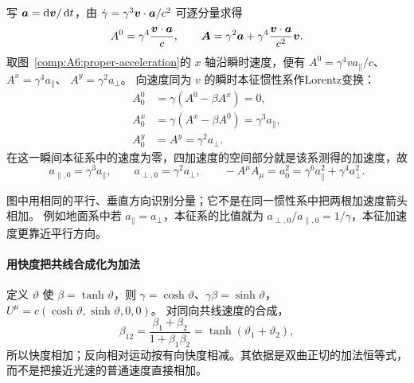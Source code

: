 写 $\bm{a}=\mathop{}\!\mathrm d\bm{v}/\mathop{}\!\mathrm d t$，由
$\dot\gamma=\gamma^3\bm{v}\cdot\bm{a}/c^2$ 可逐分量求得
\[
 A^0=\gamma^4\frac{\bm{v}\cdot\bm{a}}{c},\qquad
 \bm{A}=\gamma^2\bm{a}+
 \gamma^4\frac{\bm{v}\cdot\bm{a}}{c^2}\bm{v}.
\]
取图~\ref{comp:A6:proper-acceleration}的 $x$ 轴沿瞬时速度，便有
$A^0=\gamma^4va_\parallel/c$、$A^x=\gamma^4a_\parallel$、
$A^y=\gamma^2a_\perp$。
向速度同为 $v$ 的瞬时本征惯性系作Lorentz变换：
\[
 \begin{aligned}
 A_0^0&=\gamma(A^0-\beta A^x)=0,\\
 A_0^x&=\gamma(A^x-\beta A^0)=\gamma^3a_\parallel,\\
 A_0^y&=A^y=\gamma^2a_\perp.
 \end{aligned}
\]
在这一瞬间本征系中的速度为零，四加速度的空间部分就是该系测得的加速度，故
\[
 \boxed{a_{\parallel,0}=\gamma^3a_\parallel,\qquad
 a_{\perp,0}=\gamma^2a_\perp},\qquad
 -A^\mu A_\mu=a_0^2=\gamma^6a_\parallel^2+\gamma^4a_\perp^2.
\]
\begin{center}\begin{minipage}{.94\linewidth}\centering
{}
\label{comp:A6:proper-acceleration}
\end{minipage}\end{center}
图中用相同的平行、垂直方向识别分量；它不是在同一惯性系中把两根加速度箭头相加。
例如地面系中若 $a_\parallel=a_\perp$，本征系的比值就为
$a_{\perp,0}/a_{\parallel,0}=1/\gamma$，本征加速度更靠近平行方向。

\paragraph{用快度把共线合成化为加法}
定义 $\vartheta$ 使 $\beta=\tanh\vartheta$，则
$\gamma=\cosh\vartheta$、$\gamma\beta=\sinh\vartheta$，
$U^\mu=c(\cosh\vartheta,\sinh\vartheta,0,0)$。
对同向共线速度的合成，
\[
 \beta_{12}=\frac{\beta_1+\beta_2}{1+\beta_1\beta_2}
 =\tanh(\vartheta_1+\vartheta_2),
\]
所以快度相加；反向相对运动按有向快度相减。其依据是双曲正切的加法恒等式，
而不是把接近光速的普通速度直接相加。

